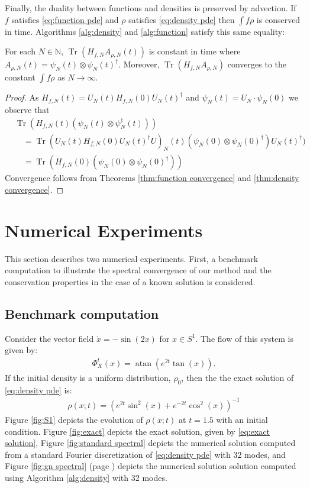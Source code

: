 \documentclass[final,leqno]{siamart}
\DeclareMathOperator{\Tr}{Tr}
\begin{document}
Finally, the duality between functions and densities is preserved by advection.  If $f$ satisfies \eqref{eq:function pde} and $\rho $ satisfies \eqref{eq:density pde} then $\int f \rho$ is conserved in time.
Algorithms \ref{alg:density} and \ref{alg:function} satisfy this same equality:
\begin{theorem}
	For each $N \in \mathbb{N}$, $\Tr( H_{f,N} A_{\rho,N} (t))$ is constant in time where $A_{\rho,N} (t)= \psi_{N}(t) \otimes \psi_{N}(t)^{\dagger}$.
	Moreover, $\Tr( H_{f,N} A_{\rho,N} )$ converges to the constant $\int f\rho $ as $N \to \infty$.
\end{theorem}
\begin{proof}
	As $H_{f,N}(t) = U_{N}(t) H_{f,N}(0) U_{N}(t)^{\dagger}$ and $\psi_{N}(t) = U_{N} \cdot \psi_{N}(0)$ we observe that
	\begin{align*}
		&\Tr( H_{f,N}(t) (\psi_{N} (t) \otimes \psi_{N}^{\dagger} (t) ) ) \\
		&\quad = \Tr(  U_{N}(t) H_{f,N}(0) U_{N}(t)^{\dagger} U)_{N}(t) (\psi_{N}(0) \otimes \psi_{N}(0)^{\dagger}) U_{N}(t)^{\dagger}) \\
		&\quad = \Tr( H_{f,N}(0) ( \psi_{N}(0) \otimes \psi_{N}(0)^{\dagger} ) )
	\end{align*}
	Convergence follows from Theorems \ref{thm:function convergence} and \ref{thm:density convergence}.
\end{proof}


\section{Numerical Experiments} \label{sec:numerics}

This section describes two numerical experiments.  First, a benchmark computation to illustrate the spectral convergence of our method and the conservation properties in the case of a known solution is considered.

\subsection{Benchmark computation}
\label{sec:benchmark}
Consider the vector field $\dot{x} = -\sin(2 x)$ for $x \in S^{1}$.
The flow of this system is given by:
\begin{align*}
	\Phi_{X}^{t}(x) = \operatorname{atan} \left( e^{2t} \tan( x) \right).
\end{align*}
If the initial density is a uniform distribution, $\rho_{0}$, then the the exact solution of \eqref{eq:density pde} is:
\begin{align}
	\rho(x;t) =  \left( e^{2t} \sin^{2}(x) + e^{-2t} \cos^{2}(x) \right)^{-1}  \label{eq:exact solution}
\end{align}
Figure \ref{fig:S1} depicts the evolution of $\rho(x;t)$ at $t=1.5$ with an initial condition.
Figure \ref{fig:exact} depicts the exact solution, given by \eqref{eq:exact solution},  Figure \ref{fig:standard spectral} depicts the numerical solution computed from a standard Fourier discretization of \eqref{eq:density pde} with 32 modes, and Figure \ref{fig:gn spectral} (page \pageref{fig:gn spectral}) depicts the numerical solution solution computed using Algorithm \ref{alg:density} with 32 modes.
\end{document}
